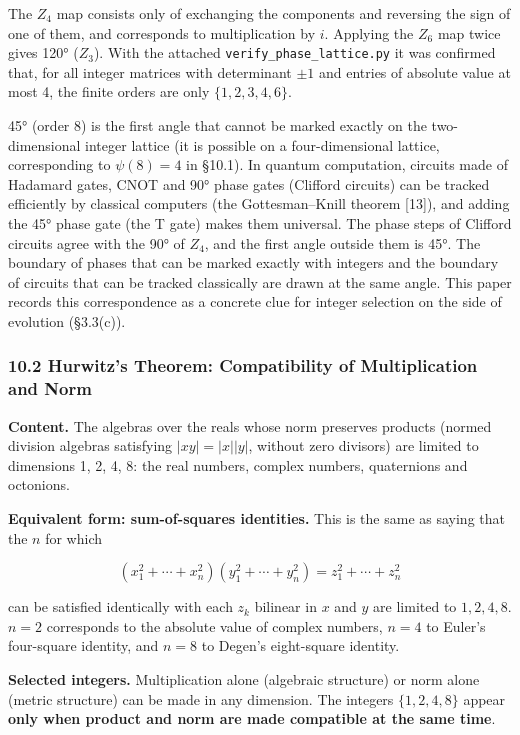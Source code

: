 \documentclass[
  a4paper,
]{article}
\begin{document}
The \(Z_4\) map consists only of exchanging the components and reversing
the sign of one of them, and corresponds to multiplication by \(i\).
Applying the \(Z_6\) map twice gives 120° (\(Z_3\)). With the attached
\texttt{verify\_\allowbreak{}phase\_\allowbreak{}lattice.py} it was confirmed that, for all
integer matrices with determinant \(\pm1\) and entries of absolute value
at most 4, the finite orders are only \(\{1,2,3,4,6\}\).

45° (order 8) is the first angle that cannot be marked exactly on the
two-dimensional integer lattice (it is possible on a four-dimensional
lattice, corresponding to \(\psi(8)=4\) in §10.1). In quantum
computation, circuits made of Hadamard gates, CNOT and 90° phase gates
(Clifford circuits) can be tracked efficiently by classical computers
(the Gottesman--Knill theorem {[}13{]}), and adding the 45° phase gate
(the T gate) makes them universal. The phase steps of Clifford circuits
agree with the 90° of \(Z_4\), and the first angle outside them is 45°.
The boundary of phases that can be marked exactly with integers and the
boundary of circuits that can be tracked classically are drawn at the
same angle. This paper records this correspondence as a concrete clue
for integer selection on the side of evolution (§3.3(c)).

\subsubsection{10.2 Hurwitz's Theorem: Compatibility of Multiplication
and
Norm}\label{hurwitzs-theorem-compatibility-of-multiplication-and-norm}

\textbf{Content.} The algebras over the reals whose norm preserves
products (normed division algebras satisfying \(|xy|=|x||y|\), without
zero divisors) are limited to dimensions 1, 2, 4, 8: the real numbers,
complex numbers, quaternions and octonions.

\textbf{Equivalent form: sum-of-squares identities.} This is the same as
saying that the \(n\) for which

\[
(x_1^2+\cdots+x_n^2)(y_1^2+\cdots+y_n^2)=z_1^2+\cdots+z_n^2
\tag{14}
\]

can be satisfied identically with each \(z_k\) bilinear in \(x\) and
\(y\) are limited to \(1,2,4,8\). \(n=2\) corresponds to the absolute
value of complex numbers, \(n=4\) to Euler's four-square identity, and
\(n=8\) to Degen's eight-square identity.

\textbf{Selected integers.} Multiplication alone (algebraic structure)
or norm alone (metric structure) can be made in any dimension. The
integers \(\{1,2,4,8\}\) appear \textbf{only when product and norm are
made compatible at the same time}.
\end{document}
